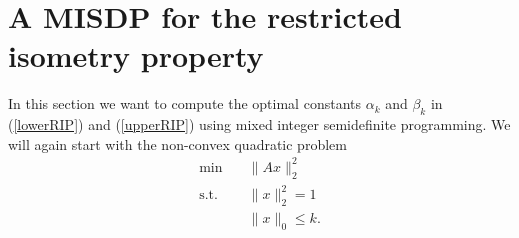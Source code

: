 \documentclass[a4paper,11pt,1p]{elsarticle}
\newcommand{\Norm}[2]{\lVert{#1}\rVert_{#2}}
\newcommand{\T}{^{\top}}
\begin{document}
 


\section{A MISDP for the restricted isometry property}
\label{sec:MISDP}

In this section we want to compute the optimal constants $\alpha_k$ and $\beta_k$ in (\ref{lowerRIP}) and (\ref{upperRIP}) using mixed integer semidefinite programming. We will again start with the non-convex quadratic problem
\begin{align}\label{QP2}
 \min \quad & \Norm{Ax}{2}^2 \nonumber \\
 \text{s.t.} \quad & \Norm{x}{2}^2 = 1 \tag{QP} \\
 & \Norm{x}{0} \leq k. \nonumber
\end{align}
\end{document}

